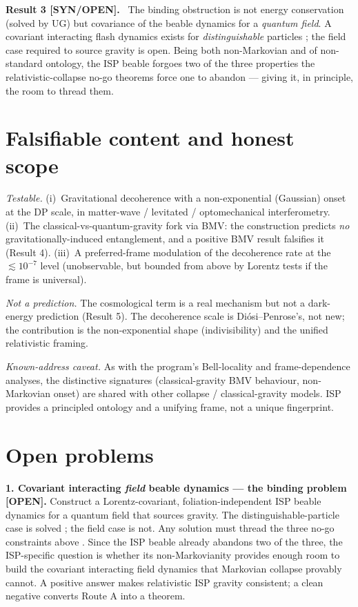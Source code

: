 \documentclass[aps,prd,preprint,amsmath,amssymb,nofootinbib,superscriptaddress]{revtex4-2}
\newenvironment{result}[1]{\par\medskip\noindent\textbf{#1}\ }{\par\medskip}
\begin{document}
\begin{result}{Result 3 [SYN/OPEN].}
The binding obstruction is not energy conservation (solved by UG) but covariance of the
beable dynamics for a \emph{quantum field}. A covariant interacting flash dynamics exists for
\emph{distinguishable} particles \cite{Tumulka2020}; the field case required to source
gravity is open. Being both non-Markovian and of non-standard ontology, the ISP beable
forgoes two of the three properties the relativistic-collapse no-go theorems force one to
abandon --- giving it, in principle, the room to thread them.
\end{result}

\section{Falsifiable content and honest scope}

\emph{Testable.} (i)~Gravitational decoherence with a non-exponential (Gaussian) onset at the
DP scale, in matter-wave / levitated / optomechanical interferometry. (ii)~The
classical-vs-quantum-gravity fork via BMV: the construction predicts \emph{no}
gravitationally-induced entanglement, and a positive BMV result falsifies it (Result 4).
(iii)~A preferred-frame modulation of the decoherence rate at the $\lesssim10^{-7}$ level
(unobservable, but bounded from above by Lorentz tests if the frame is universal).

\emph{Not a prediction.} The cosmological term is a real mechanism but not a dark-energy
prediction (Result 5). The decoherence scale is Di\'osi--Penrose's, not new; the contribution
is the non-exponential shape (indivisibility) and the unified relativistic framing.

\emph{Known-address caveat.} As with the program's Bell-locality and frame-dependence
analyses, the distinctive signatures (classical-gravity BMV behaviour, non-Markovian onset)
are shared with other collapse / classical-gravity models. ISP provides a principled ontology
and a unifying frame, not a unique fingerprint.

\section{Open problems}

\textbf{1. Covariant interacting \emph{field} beable dynamics --- the binding problem
[OPEN].} Construct a Lorentz-covariant, foliation-independent ISP beable dynamics for a
quantum field that sources gravity. The distinguishable-particle case is solved
\cite{Tumulka2020}; the field case is not. Any solution must thread the three no-go
constraints above \cite{MassCoupled2020,Gisin1989}. Since the ISP beable already abandons two
of the three, the ISP-specific question is whether its non-Markovianity provides enough room
to build the covariant interacting field dynamics that Markovian collapse provably cannot. A
positive answer makes relativistic ISP gravity consistent; a clean negative converts Route A
into a theorem.
\end{document}
